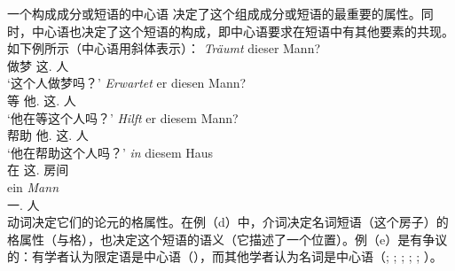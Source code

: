 一个构成成分或短语的中心语 决定了这个组成成分或短语的最重要的属性。同时，中心语也决定了这个短语的构成，即中心语要求在短语中有其他要素的共现。如下例所示（中心语用斜体表示）：
\eal
\ex 
\gll \emph{Träumt} dieser Mann?\\
     做梦 这.\nom{} 人\\
\glt `这个人做梦吗？'
\ex 
\gll \emph{Erwartet} er diesen Mann?\\
	 等 他.\nom{} 这.\acc{} 人\\
\glt `他在等这个人吗？'
\ex 
\gll \emph{Hilft} er diesem Mann?\\
	 帮助 他.\nom{} 这.\dat{} 人\\
\glt `他在帮助这个人吗？'
\ex 
\gll \emph{in} diesem Haus\\
	 在 这.\dat{} 房间\\
\ex 
\gll ein \emph{Mann}\\
	 一.\nom{} 人\\
\zl
动词决定它们的论元的格属性。在例（d）中，介词决定名词短语（这个房子）的格属性（与格），也决定这个短语的语义（它描述了一个位置）。例（e）是有争议的：有学者认为限定语是中心语（\citealp{VH77a-u,Hellan86a,Abney87a,Netter94,Netter98a}），而其他学者认为名词是中心语（\citealp{vanLangendonck94a}; \citealp[]{ps2}; \citealp{Demske2001a};
\citealp[Section~6.6.1]{MuellerLehrbuch1}; \citealp{Hudson2004a}; \citealp{Bruening2009a}）。

